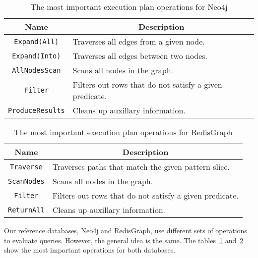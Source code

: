 \documentclass[14pt]{constructor-thesis}
\theoremstyle{definition}
\begin{document}
\begin{table}[t]
  \centering
  
  \begin{center}
    \begin{tabular}{ |c|l|  }
      \hline
      Name & \multicolumn{1}{c|}{Description} \\
      \hline
      \texttt{Expand(All)} & Traverses all edges from a given node. \\
      \texttt{Expand(Into)} & Traverses all edges between two nodes. \\
      \texttt{AllNodesScan} & Scans all nodes in the graph. \\
      \texttt{Filter} & Filters out rows that do not satisfy a given predicate. \\
      \texttt{ProduceResults} & Cleans up auxillary information. \\
      \hline
    \end{tabular}
  \end{center}
  \caption{The most important execution plan operations for Neo4j}
  \label{tab:execution-plan-operations-summary-Neo4j}
\end{table}
\begin{table}[t]
  \begin{center}
    \begin{tabular}{ |c|l|  }
      \hline
      Name & \multicolumn{1}{c|}{Description} \\
      \hline
      \texttt{Traverse} & Traverses paths that match the given pattern slice. \\
      \texttt{ScanNodes} & Scans all nodes in the graph. \\
      \texttt{Filter} & Filters out rows that do not satisfy a given predicate. \\
      \texttt{ReturnAll} & Cleans up auxillary information. \\
      \hline
    \end{tabular}
  \end{center}
  \caption{The most important execution plan operations for RedisGraph}
  \label{tab:execution-plan-operations-summary-RedisGraph}
\end{table}

Our reference databases, Neo4j and RedisGraph, use different sets of operations to evaluate queries. However, the general idea is the same. The tables~\ref{tab:execution-plan-operations-summary-Neo4j} and~\ref{tab:execution-plan-operations-summary-RedisGraph} show the most important operations for both databases.
\end{document}
